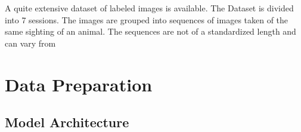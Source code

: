 \documentclass{article}
\begin{document}
A quite extensive dataset of labeled images is available. The Dataset is divided into 7 sessions. The images are grouped into sequences
of images taken of the same sighting of an animal. The sequences are not of a standardized length and can vary from 

\section*{Data Preparation}



\subsection*{Model Architecture}
\end{document}
